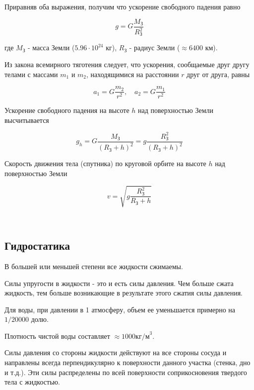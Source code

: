 \documentclass[a4paper,12pt]{article}
\begin{document}
		Приравняв оба выражения, получим что ускорение свободного падения равно

		\begin{equation*}
			g = G \frac{M_\text{З}}{R^2_\text{З}}
		\end{equation*}

		где $M_\text{З}$ - масса Земли ($5.96 \cdot 10^{24}$ кг), $R_\text{З}$ - радиус Земли
		($\approx 6400$ км).

		Из закона всемирного тяготения следует, что ускорения, сообщаемые друг другу телами
		с массами $m_1$ и $m_2$, находящимися на расстоянии $r$ друг от друга, равны

		\begin{equation*}
			a_1 = G \frac{m_2}{r^2}, \quad a_2 = G \frac{m_1}{r^2}
		\end{equation*}


		Ускорение свободного падения на высоте $h$ над поверхностью Земли высчитывается

		\begin{equation}
			g_h = G \frac{M_\text{З}}{(R_\text{З} + h)^2} = g \frac{R_\text{З}^2}{(R_\text{З} + h)^2}
		\end{equation}

		Скорость движения тела (спутника) по круговой орбите на высоте $h$ над поверхностью Земли

		\begin{equation}
			v = \sqrt{g \frac{R^2_\text{З}}{R_\text{З} + h}}
		\end{equation}

		\


		\subsection*{Гидростатика}

		В большей или меньшей степени все жидкости сжимаемы.

		Силы упругости в жидкости - это и есть силы давления. Чем больше сжата жидкость,
		тем больше возникающие в результате этого сжатия силы давления.

		Для воды, при давлении в 1 атмосферу, объем ее уменьшается примерно на 
		$1/20000$ долю.

		Плотность чистой воды составляет $\approx 1000 \text{кг/м}^3$.

		Силы давления со стороны жидкости действуют на все стороны сосуда и направлены 
		всегда перпендикулярно к поверхности данного участка (стенка, дно и т.д.).
		Эти силы распределены по всей поверхности соприкосновения твердого тела с
		жидкостью.
\end{document}
